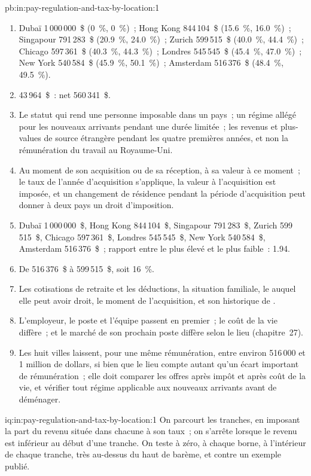 \begin{solution}{pb:in:pay-regulation-and-tax-by-location:1}
\begin{enumerate}
\item Dubaï 1\,000\,000~\$ (0~\%, 0~\%)~; Hong Kong 844\,104~\$ (15.6~\%, 16.0~\%)~; Singapour 791\,283~\$ (20.9~\%, 24.0~\%)~; Zurich
599\,515~\$ (40.0~\%, 44.4~\%)~; Chicago 597\,361~\$ (40.3~\%, 44.3~\%)~; Londres 545\,545~\$ (45.4~\%, 47.0~\%)~; New York 540\,584~\$
(45.9~\%, 50.1~\%)~; Amsterdam 516\,376~\$ (48.4~\%, 49.5~\%).
\item 43\,964~\$~: net 560\,341~\$.
\item Le statut qui rend une personne imposable dans un pays~; un régime allégé pour les nouveaux arrivants pendant une durée limitée~; les revenus et
plus-values de source étrangère pendant les quatre premières années, et non la rémunération du travail au Royaume-Uni.
\item Au moment de son acquisition ou de sa réception, à sa valeur à ce moment~; le taux de l'année d'acquisition s'applique, la valeur à l'acquisition est imposée, et
un changement de résidence pendant la période d'acquisition peut donner à deux pays un droit d'imposition.
\item Dubaï 1\,000\,000~\$, Hong Kong 844\,104~\$, Singapour 791\,283~\$, Zurich 599\,515~\$, Chicago 597\,361~\$, Londres 545\,545~\$,
New York 540\,584~\$, Amsterdam 516\,376~\$~; rapport entre le plus élevé et le plus faible~: 1.94.
\item De 516\,376~\$ à 599\,515~\$, soit 16~\%.
\item Les cotisations de retraite et les déductions, la situation familiale, le  auquel elle peut avoir droit, le moment de l'acquisition, et
son historique de .
\item L'employeur, le poste et l'équipe passent en premier~; le coût de la vie diffère~; et le marché de son prochain poste diffère selon
le lieu (chapitre~27).
\item Les huit villes laissent, pour une même rémunération, entre environ 516\,000 et 1 million de dollars, si bien que le lieu compte autant qu'un
écart important de rémunération~; elle doit comparer les offres après impôt et après coût de la vie, et vérifier tout régime applicable aux nouveaux arrivants
avant de déménager.
\end{enumerate}
\end{solution}

\begin{solution}{iq:in:pay-regulation-and-tax-by-location:1}
On parcourt les tranches, en imposant la part du revenu située dans chacune à son taux~; on s'arrête lorsque le revenu est inférieur au début d'une tranche. On
teste à zéro, à chaque borne, à l'intérieur de chaque tranche, très au-dessus du haut de barème, et contre un exemple publié.
\end{solution}

